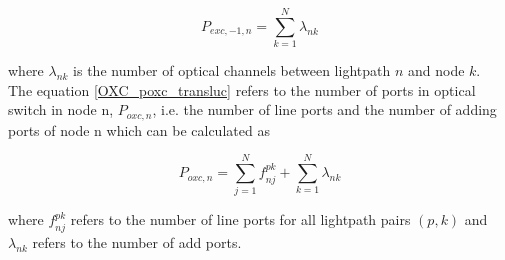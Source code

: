 \begin{equation}
P_{exc,-1,n} = \sum_{k=1}^{N} \lambda_{nk}
\label{EXC_pexc2_transluc}
\end{equation}

\noindent
where $\lambda_{nk}$ is the number of optical channels between lightpath $n$ and node $k$.\\

The equation \ref{OXC_poxc_transluc} refers to the number of ports in optical switch in node n, $P_{oxc,n}$, i.e. the number of line ports and the number of adding ports of node n which can be calculated as

\begin{equation}
P_{oxc,n} = \sum_{j=1}^{N} f_{nj}^{pk} + \sum_{k=1}^{N} \lambda_{nk}
\label{OXC_poxc_transluc}
\end{equation}

\noindent
where $f_{nj}^{pk}$ refers to the number of line ports for all lightpath pairs $(p,k)$ and $\lambda_{nk}$ refers to the number of add ports.
